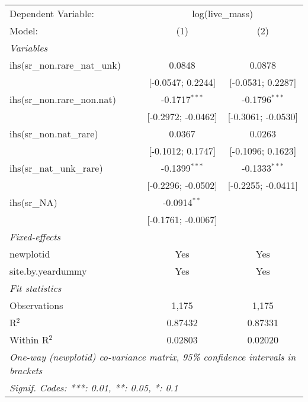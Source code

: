 \begin{tabular}{lcc}
\tabularnewline\midrule\midrule
Dependent Variable:&\multicolumn{2}{c}{log(live\_mass)}\\
Model:&(1) & (2)\\
\midrule \emph{Variables}&   &  \\
ihs(sr\_non.rare\_nat\_unk)&0.0848 & 0.0878\\
  &[-0.0547; 0.2244] & [-0.0531; 0.2287]\\
ihs(sr\_non.rare\_non.nat)&-0.1717$^{***}$ & -0.1796$^{***}$\\
  &[-0.2972; -0.0462] & [-0.3061; -0.0530]\\
ihs(sr\_non.nat\_rare)&0.0367 & 0.0263\\
  &[-0.1012; 0.1747] & [-0.1096; 0.1623]\\
ihs(sr\_nat\_unk\_rare)&-0.1399$^{***}$ & -0.1333$^{***}$\\
  &[-0.2296; -0.0502] & [-0.2255; -0.0411]\\
ihs(sr\_NA)&-0.0914$^{**}$ &   \\
  &[-0.1761; -0.0067] &   \\
\midrule \emph{Fixed-effects}&   &  \\
newplotid & Yes & Yes\\
site.by.yeardummy & Yes & Yes\\
\midrule \emph{Fit statistics}&  & \\
Observations & 1,175&1,175\\
R$^2$ & 0.87432&0.87331\\
Within R$^2$ & 0.02803&0.02020\\
\midrule\midrule\multicolumn{3}{l}{\emph{One-way (newplotid) co-variance matrix, 95\% confidence intervals in brackets}}\\
\multicolumn{3}{l}{\emph{Signif. Codes: ***: 0.01, **: 0.05, *: 0.1}}\\
\end{tabular}


